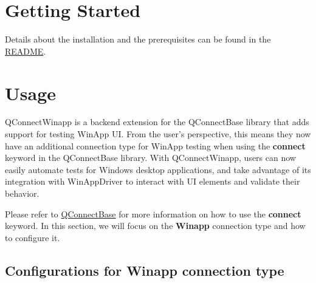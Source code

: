 



\hypertarget{getting-started}{%
\section{Getting Started}\label{getting-started}}

Details about the installation and the prerequisites can be found in the
\href{https://github.com/test-fullautomation/robotframework-qconnect-winapp/blob/develop/README.rst}{README}.

\hypertarget{usage}{%
\section{Usage}\label{usage}}

QConnectWinapp is a backend extension for the QConnectBase library that adds support for testing WinApp UI.
From the user's perspective, this means they now have an additional connection type for WinApp testing when using the \textbf{connect} keyword in the QConnectBase library.
With QConnectWinapp, users can now easily automate tests for Windows desktop applications, and take advantage of its integration with WinAppDriver to interact with UI elements and validate their behavior.

Please refer to \href{https://github.com/test-fullautomation/robotframework-qconnect-base/blob/develop/QConnectBase/QConnectBase.pdf}{QConnectBase} for more information on how to use the \textbf{connect} keyword.
In this section, we will focus on the \textbf{Winapp} connection type and how to configure it.

\hypertarget{connect}{%
\subsection{\texorpdfstring{\textbf{Configurations for Winapp connection type}}{connect}}\label{connect}}

